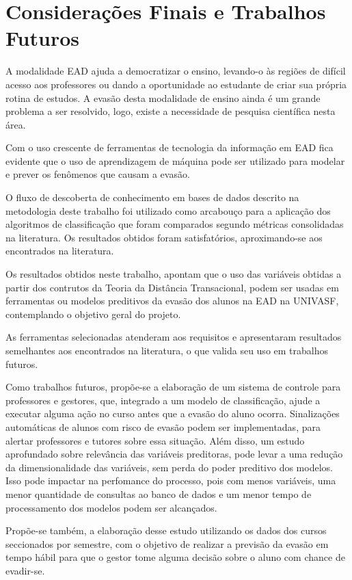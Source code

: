 \chapter{Considerações Finais e Trabalhos Futuros}

A modalidade EAD ajuda a democratizar o ensino, levando-o às regiões de difícil
acesso aos professores ou dando a oportunidade ao estudante de criar sua própria
rotina de estudos. A evasão desta modalidade de ensino ainda é um grande
problema a ser resolvido, logo, existe a necessidade de pesquisa científica
nesta área.

Com o uso crescente de ferramentas de tecnologia da informação em EAD fica
evidente que o uso de aprendizagem de máquina pode ser utilizado para modelar e
prever os fenômenos que causam a evasão.

O fluxo de descoberta de conhecimento em bases de dados descrito na metodologia
deste trabalho foi utilizado como arcabouço para a aplicação dos algoritmos de
classificação que foram comparados segundo métricas consolidadas na literatura.
Os resultados obtidos foram satisfatórios, aproximando-se aos encontrados na
literatura.

Os resultados obtidos neste trabalho, apontam que o uso das variáveis obtidas
a partir dos contrutos da Teoria da Distância Transacional, podem ser usadas
em ferramentas ou modelos preditivos da evasão dos alunos na EAD na UNIVASF,
contemplando o objetivo geral do projeto.

As ferramentas selecionadas atenderam aos requisitos e apresentaram resultados
semelhantes aos encontrados na literatura, o que valida seu uso em trabalhos
futuros.

Como trabalhos futuros, propõe-se a elaboração de um sistema de controle para
professores e gestores, que, integrado a um modelo de classificação, ajude a
executar alguma ação no curso antes que a evasão do aluno ocorra. Sinalizações
automáticas de alunos com risco de evasão podem ser implementadas, para alertar
professores e tutores sobre essa situação. Além disso, um estudo aprofundado
sobre relevância das variáveis preditoras, pode levar a uma redução da
dimensionalidade das variáveis, sem perda do poder preditivo dos modelos. Isso
pode impactar na perfomance do processo, pois com menos variáveis, uma menor
quantidade de consultas ao banco de dados e um menor tempo de processamento dos
modelos podem ser alcançados.

Propõe-se também, a elaboração desse estudo utilizando os dados dos cursos
seccionados por semestre, com o objetivo de realizar a previsão da evasão em
tempo hábil para que o gestor tome alguma decisão sobre o aluno com chance de
evadir-se.